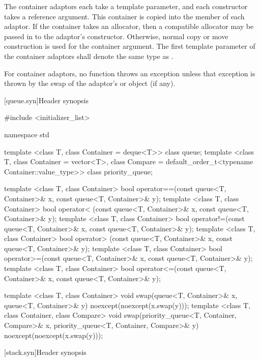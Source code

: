 \pnum
The container adaptors each take a  template parameter, and each constructor takes
a  reference argument. This container is copied into the  member
of each adaptor. If the container takes an allocator, then a compatible allocator may be passed in
to the adaptor's constructor. Otherwise, normal copy or move construction is used for the container
argument.
The first template parameter  of the container adaptors
shall denote the same type as .

\pnum
For container adaptors, no  function throws an exception unless that
exception is thrown by the swap of the adaptor's  or
 object (if any).

[queue.syn]{Header  synopsis}%

\begin{codeblock}
#include <initializer_list>

namespace std {
  template <class T, class Container = deque<T>> class queue;
  template <class T, class Container = vector<T>,
            class Compare = default_order_t<typename Container::value_type>>
    class priority_queue;

  template <class T, class Container>
    bool operator==(const queue<T, Container>& x, const queue<T, Container>& y);
  template <class T, class Container>
    bool operator< (const queue<T, Container>& x, const queue<T, Container>& y);
  template <class T, class Container>
    bool operator!=(const queue<T, Container>& x, const queue<T, Container>& y);
  template <class T, class Container>
    bool operator> (const queue<T, Container>& x, const queue<T, Container>& y);
  template <class T, class Container>
    bool operator>=(const queue<T, Container>& x, const queue<T, Container>& y);
  template <class T, class Container>
    bool operator<=(const queue<T, Container>& x, const queue<T, Container>& y);

  template <class T, class Container>
    void swap(queue<T, Container>& x, queue<T, Container>& y) noexcept(noexcept(x.swap(y)));
  template <class T, class Container, class Compare>
    void swap(priority_queue<T, Container, Compare>& x,
              priority_queue<T, Container, Compare>& y) noexcept(noexcept(x.swap(y)));
}
\end{codeblock}

[stack.syn]{Header  synopsis}%

